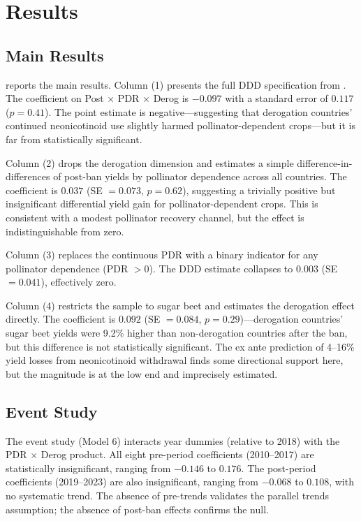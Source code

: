 \documentclass[12pt]{article}
\begin{document}
\section{Results}

\subsection{Main Results}



 reports the main results. Column (1) presents the full DDD specification from . The coefficient on Post $\times$ PDR $\times$ Derog is $-0.097$ with a standard error of $0.117$ ($p = 0.41$). The point estimate is negative---suggesting that derogation countries' continued neonicotinoid use slightly harmed pollinator-dependent crops---but it is far from statistically significant.

Column (2) drops the derogation dimension and estimates a simple difference-in-differences of post-ban yields by pollinator dependence across all countries. The coefficient is $0.037$ (SE $= 0.073$, $p = 0.62$), suggesting a trivially positive but insignificant differential yield gain for pollinator-dependent crops. This is consistent with a modest pollinator recovery channel, but the effect is indistinguishable from zero.

Column (3) replaces the continuous PDR with a binary indicator for any pollinator dependence (PDR $> 0$). The DDD estimate collapses to $0.003$ (SE $= 0.041$), effectively zero.

Column (4) restricts the sample to sugar beet and estimates the derogation effect directly. The coefficient is $0.092$ (SE $= 0.084$, $p = 0.29$)---derogation countries' sugar beet yields were 9.2\% higher than non-derogation countries after the ban, but this difference is not statistically significant. The ex ante prediction of 4--16\% yield losses from neonicotinoid withdrawal finds some directional support here, but the magnitude is at the low end and imprecisely estimated.

\subsection{Event Study}

The event study (Model 6) interacts year dummies (relative to 2018) with the PDR $\times$ Derog product. All eight pre-period coefficients (2010--2017) are statistically insignificant, ranging from $-0.146$ to $0.176$. The post-period coefficients (2019--2023) are also insignificant, ranging from $-0.068$ to $0.108$, with no systematic trend. The absence of pre-trends validates the parallel trends assumption; the absence of post-ban effects confirms the null.
\end{document}
